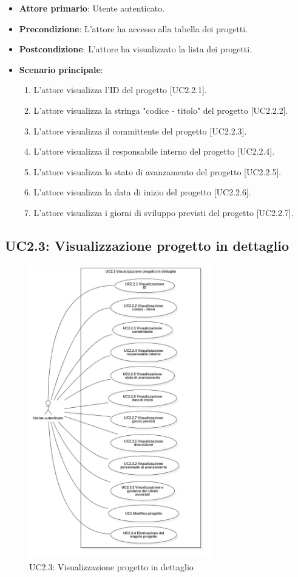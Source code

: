 \begin{itemize}
\item \textbf{Attore primario}: Utente autenticato.
\item \textbf{Precondizione}: L'attore ha accesso alla tabella dei progetti.
\item \textbf{Postcondizione}: L'attore ha visualizzato la lista dei progetti.
\item \textbf{Scenario principale}: 
\begin{enumerate}
\item L'attore visualizza l'ID del progetto [UC2.2.1].
\item L'attore visualizza la stringa "codice - titolo" del progetto [UC2.2.2].
\item L'attore visualizza il committente del progetto [UC2.2.3].
\item L'attore visualizza il responsabile interno del progetto [UC2.2.4].
\item L'attore visualizza lo stato di avanzamento del progetto [UC2.2.5].
\item L'attore visualizza la data di inizio del progetto [UC2.2.6].
\item L'attore visualizza i giorni di sviluppo previsti del progetto [UC2.2.7].
\end{enumerate}
\end{itemize}

\pagebreak

\subsection{UC2.3: Visualizzazione progetto in dettaglio}
\begin{figure}[!h]
\centering
\includegraphics[width=300px]{../images/UC/.jpeg/UC2.3-visualizzazioneDettaglioProgetto.jpg}
\caption{UC2.3: Visualizzazione progetto in dettaglio}
\end{figure}

